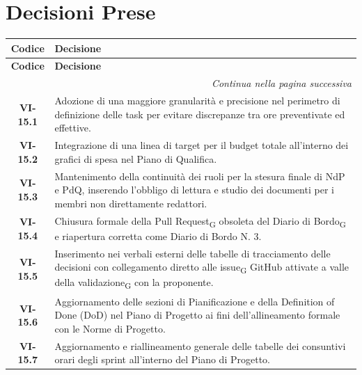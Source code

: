 \section{Decisioni Prese}

\renewcommand{\arraystretch}{1.3}
\vspace{-0.3cm}
\noindent
\begin{longtable}{c p{12cm}}
	\toprule
	\textbf{Codice} & \textbf{Decisione} \\
	\midrule
	\endfirsthead

	\toprule
	\textbf{Codice} & \textbf{Decisione} \\
	\midrule
	\endhead

	\midrule
	\multicolumn{2}{r}{\textit{Continua nella pagina successiva}} \\
	\midrule
	\endfoot

	\bottomrule
	\endlastfoot

	\textbf{VI-15.1} & {Adozione di una maggiore granularità e precisione nel perimetro di definizione delle task per evitare discrepanze tra ore preventivate ed effettive.} \\
	\textbf{VI-15.2} & {Integrazione di una linea di target per il budget totale all'interno dei grafici di spesa nel Piano di Qualifica.} \\
	\textbf{VI-15.3} & {Mantenimento della continuità dei ruoli per la stesura finale di NdP e PdQ, inserendo l'obbligo di lettura e studio dei documenti per i membri non direttamente redattori.} \\
	\textbf{VI-15.4} & {Chiusura formale della Pull Request\textsubscript{G} obsoleta del Diario di Bordo\textsubscript{G} e riapertura corretta come Diario di Bordo N. 3.} \\
	\textbf{VI-15.5} & {Inserimento nei verbali esterni delle tabelle di tracciamento delle decisioni con collegamento diretto alle issue\textsubscript{G} GitHub attivate a valle della validazione\textsubscript{G} con la proponente.} \\
	\textbf{VI-15.6} & {Aggiornamento delle sezioni di Pianificazione e della Definition of Done (DoD) nel Piano di Progetto ai fini dell'allineamento formale con le Norme di Progetto.} \\
	\textbf{VI-15.7} & {Aggiornamento e riallineamento generale delle tabelle dei consuntivi orari degli sprint all'interno del Piano di Progetto.}

\end{longtable}

